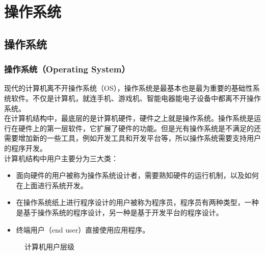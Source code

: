 \chapter{操作系统}

\section{操作系统}

\subsection{操作系统（Operating System）}

现代的计算机离不开操作系统（OS），操作系统是最基本也是最为重要的基础性系统软件。不仅是计算机，就连手机、游戏机、智能电器能电子设备中都离不开操作系统。\\

在计算机结构中，最底层的是计算机硬件，硬件之上就是操作系统。操作系统是运行在硬件上的第一层软件，它扩展了硬件的功能。但是光有操作系统是不满足的还需要增加新的一些工具，例如开发工具和开发平台等，所以操作系统需要支持用户的程序开发。\\

计算机结构中用户主要分为三大类：

\begin{itemize}
	\item 面向硬件的用户被称为操作系统设计者，需要熟知硬件的运行机制，以及如何在上面进行系统开发。

	\item 在操作系统纸上进行程序设计的用户被称为程序员，程序员有两种类型，一种是基于操作系统的程序设计，另一种是基于开发平台的程序设计。

	\item 终端用户（end user）直接使用应用程序。
\end{itemize}

\begin{figure}[H]
	\centering
	\caption{计算机用户层级}
\end{figure}

\vspace{0.5cm}

